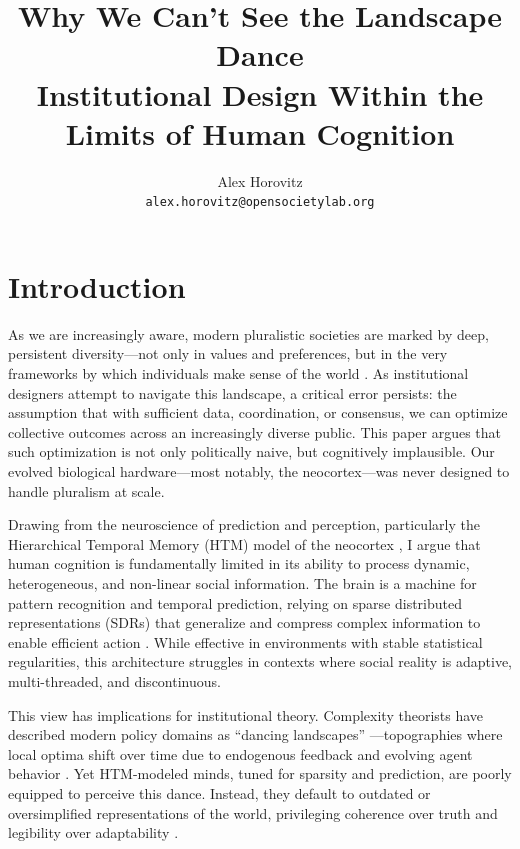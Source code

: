 \documentclass[12pt]{article}  %
\title{Why We Can’t See the Landscape Dance\\
\small Institutional Design Within the Limits of Human Cognition}
\author{Alex Horovitz \\\small \texttt{alex.horovitz@opensocietylab.org}}
\date{June 18, 2025\\
\begin{center}
\textit{Second Annual PPE At the Frontier Workshop:\\
Institutional Diversity and Social Dynamism\\
\textbf{University at Buffalo}}
\end{center}}
\begin{document}
\setlength{\parskip}{0.75em}

\maketitle

\section*{Introduction}

As we are increasingly aware, modern pluralistic societies are marked by deep, persistent diversity—not only in values and preferences, but in the very frameworks by which individuals make sense of the world \parencite{gaus2021open, muldoon2016social}. As institutional designers attempt to navigate this landscape, a critical error persists: the assumption that with sufficient data, coordination, or consensus, we can optimize collective outcomes across an increasingly diverse public. This paper argues that such optimization is not only politically naive, but cognitively implausible. Our evolved biological hardware—most notably, the neocortex—was never designed to handle pluralism at scale.

Drawing from the neuroscience of prediction and perception, particularly the Hierarchical Temporal Memory (HTM) model of the neocortex \parencite{hawkins2004intelligence, hawkins2021thousand}, I argue that human cognition is fundamentally limited in its ability to process dynamic, heterogeneous, and non-linear social information. The brain is a machine for pattern recognition and temporal prediction, relying on sparse distributed representations (SDRs) that generalize and compress complex information to enable efficient action \parencite{ahmad2016neurons}. While effective in environments with stable statistical regularities, this architecture struggles in contexts where social reality is adaptive, multi-threaded, and discontinuous.

This view has implications for institutional theory. Complexity theorists have described modern policy domains as “dancing landscapes” —topographies where local optima shift over time due to endogenous feedback and evolving agent behavior \parencite{kauffman1993origins, page2011diversity}. Yet HTM-modeled minds, tuned for sparsity and prediction, are poorly equipped to perceive this dance. Instead, they default to outdated or oversimplified representations of the world, privileging coherence over truth and legibility over adaptability \parencite{scott1998seeing}.
\end{document}
